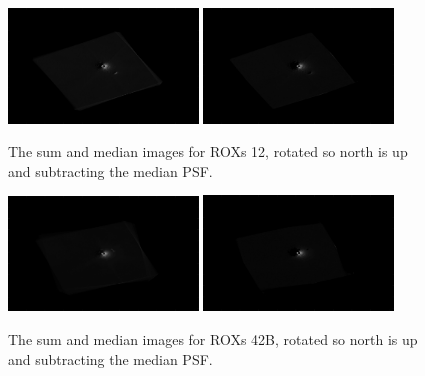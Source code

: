 \documentclass[12pt]{article}
\begin{document}
\begin{figure}[H]
\centering
\includegraphics[width=0.45\textwidth]{sum_rot_adi_12.png}
\includegraphics[width=0.45\textwidth]{med_rot_adi_12.png}
\vspace{-1em}
\caption{The sum and median images for ROXs 12, rotated so north is up and subtracting the median PSF.}
\end{figure}
\vspace{-1em}
\begin{figure}[H]
\centering
\includegraphics[width=0.45\textwidth]{sum_rot_adi_42b.png}
\includegraphics[width=0.45\textwidth]{med_rot_adi_42b.png}
\vspace{-1em}
\caption{The sum and median images for ROXs 42B, rotated so north is up and subtracting the median PSF.}
\end{figure}
\vspace{-1em}
\end{document}
